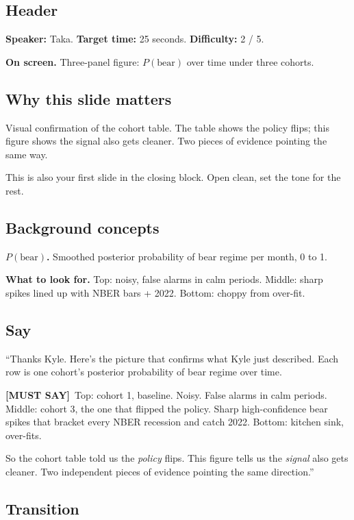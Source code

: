 \documentclass[11pt]{article}
\newcommand{\mustsay}[1]{\textcolor{must}{\textbf{[MUST SAY]}}\ #1}
\begin{document}
\subsection*{Header}

\textbf{Speaker:} Taka. \quad\textbf{Target time:} 25 seconds. \quad\textbf{Difficulty:} 2 / 5.

\textbf{On screen.} Three-panel figure: $P(\text{bear})$ over time under three cohorts.

\subsection*{Why this slide matters}

Visual confirmation of the cohort table. The table shows the policy flips; this figure shows the signal also gets cleaner. Two pieces of evidence pointing the same way.

This is also your first slide in the closing block. Open clean, set the tone for the rest.

\subsection*{Background concepts}

\textbf{$P(\text{bear})$.} Smoothed posterior probability of bear regime per month, 0 to 1.

\textbf{What to look for.} Top: noisy, false alarms in calm periods. Middle: sharp spikes lined up with NBER bars + 2022. Bottom: choppy from over-fit.

\subsection*{Say}

``Thanks Kyle. Here's the picture that confirms what Kyle just described. Each row is one cohort's posterior probability of bear regime over time.

\mustsay{Top: cohort 1, baseline. Noisy. False alarms in calm periods. Middle: cohort 3, the one that flipped the policy. Sharp high-confidence bear spikes that bracket every NBER recession and catch 2022. Bottom: kitchen sink, over-fits.}

So the cohort table told us the \emph{policy} flips. This figure tells us the \emph{signal} also gets cleaner. Two independent pieces of evidence pointing the same direction.''

\subsection*{Transition}
\end{document}
